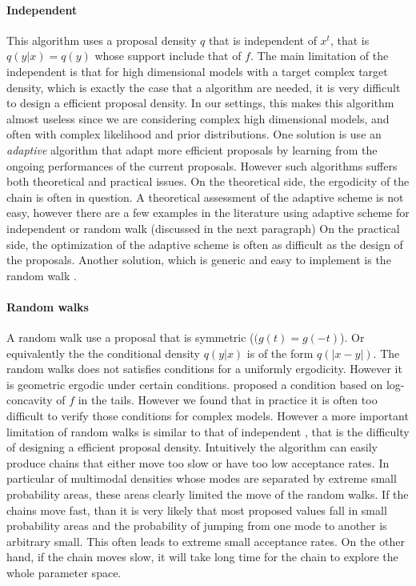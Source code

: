 \paragraph{Independent \mha} This algorithm uses a proposal density $q$ that
is independent of $x^t$, that is $q(y|x) = q(y)$ whose support include that of
$f$. The main limitation of the independent \mha is that for high dimensional
models with a target complex target density, which is exactly the case that a
\mcmc algorithm are needed, it is very difficult to design a efficient
proposal density. In our settings, this makes this algorithm almost useless
since we are considering complex high dimensional models, and often with
complex likelihood and prior distributions. One solution is use an
\emph{adaptive} algorithm that adapt more efficient proposals by learning from
the ongoing performances of the current proposals. However such algorithms
suffers both theoretical and practical issues. On the theoretical side, the
ergodicity of the chain is often in question. A theoretical assessment of the
adaptive scheme is not easy, however there are a few examples in the
literature using adaptive scheme for independent or random walk (discussed in
the next paragraph) \mha \parencites(e.g.,
see)(){Gilks1998,Haario:1999dh,Haario:2001gu} On the practical side, the
optimization of the adaptive scheme is often as difficult as the design of the
proposals. Another solution, which is generic and easy to implement is the
random walk \mha.

\paragraph{Random walks} A random walk \mha use a proposal that is symmetric
($(g(t) = g(-t)$). Or equivalently the the conditional density $q(y|x)$ is of
the form $q(|x-y|)$. The random walks does not satisfies conditions for a
uniformly ergodicity. However it is geometric ergodic under certain
conditions. \textcite{Mengersen:1996th} proposed a condition based on
log-concavity of $f$ in the tails. However we found that in practice it is
often too difficult to verify those conditions for complex models. However a
more important limitation of random walks is similar to that of independent
\mha, that is the difficulty of designing a efficient proposal density.
Intuitively the algorithm can easily produce chains that either move too slow
or have too low acceptance rates. In particular of multimodal densities whose
modes are separated by extreme small probability areas, these areas clearly
limited the move of the random walks. If the chains move fast, than it is very
likely that most proposed values fall in small probability areas and the
probability of jumping from one mode to another is arbitrary small. This often
leads to extreme small acceptance rates. On the other hand, if the chain moves
slow, it will take long time for the chain to explore the whole parameter
space.

